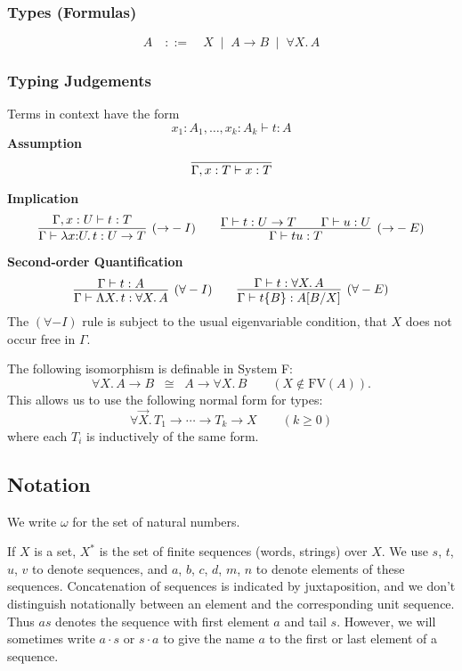 \documentclass[a4paper,11pt]{article}
\begin{document}
\subsubsection*{Types (Formulas)}
\[ A \quad ::= \quad X \; \mid \; A \rightarrow B \; \mid \; \forall X. \, A \]


\subsubsection*{Typing Judgements}
Terms in context have the form
\[ x_1 : A_1 , \ldots , x_k : A_k \vdash t : A \]
\textbf{Assumption}
\[ \infer{\Gamma , x:T \vdash  x:T}{} \]

\noindent \textbf{Implication}
\[ \infer[({\rightarrow}-I)]{\Gamma \vdash \lambda x{:}U. \, t: U \rightarrow T}{\Gamma , x:U \vdash t:T}
\qquad
\infer[({\rightarrow}-E)]{\Gamma \vdash tu : T}{\Gamma \vdash t : U \rightarrow T \qquad \Gamma
  \vdash u:U}
\]

\noindent \textbf{Second-order Quantification}
\[  \infer[({\forall}-I)]{\Gamma \vdash \Lambda X. \, t : \forall
  X. \, A}{\Gamma \vdash t:A}  \qquad
\infer[({\forall}-E)]{\Gamma \vdash t\{ B \} :
  A[B/X]}{\Gamma \vdash t : \forall X. \, A}
\]
The $(\forall-I)$ rule is subject to the usual eigenvariable
condition, that $X$ does not occur free in $\Gamma$.

\noindent The following isomorphism is definable in System F:
\[ \forall X. \, A \rightarrow B \;\; \cong \;\; A \rightarrow \forall
X. \, B \qquad (X \not\in \mathrm{FV}(A)) . \]
This allows us to use the following normal form for types:
\[ \forall \vec{X}. \, T_1 \rightarrow \cdots \rightarrow T_k
\rightarrow X \qquad (k \geq 0) \]
where each $T_i$ is inductively of the same form.

\subsection{Notation}
We write $\omega$ for the set of natural numbers.

If $X$ is a set, $X^*$ is the set of finite sequences (words, strings)
over $X$.  We use $s$, $t$, $u$, $v$ to denote sequences, and $a$,
$b$, $c$, $d$, $m$, $n$ to denote elements of these sequences.
Concatenation of sequences is indicated by juxtaposition, and we don't
distinguish notationally between an element and the corresponding unit
sequence. Thus $as$ denotes the sequence with first element $a$ and
tail
$s$. However, we will sometimes write $a \cdot s$ or $s \cdot a$ to
give the name $a$ to the first or last element of a sequence.
\end{document}

